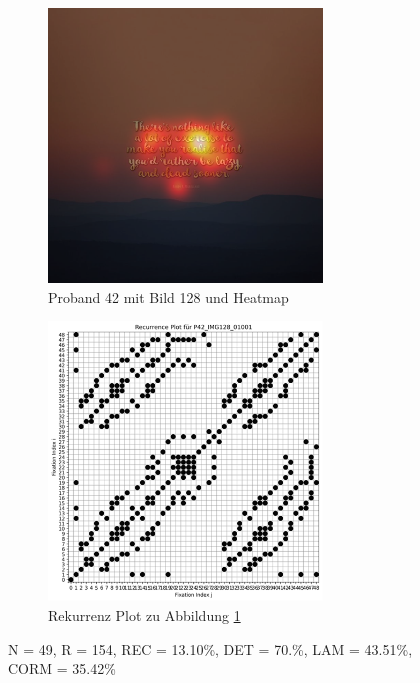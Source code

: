 \documentclass[
    language=german, %
    thesis=seminar, %
    supervisor=postdoc, %
    multiauthor=true, %
    ]{settings/csssa-thesis}
\begin{document}
\begin{figure}[ht]
    \centering
    \begin{subfigure}{0.49\textwidth}
        \centering
        \includegraphics[width=0.8\textwidth]{figures/Bild14.png}
        \caption{Proband 42 mit Bild 128 und Heatmap}\label{fig:Bild13a}
    \end{subfigure}
    \begin{subfigure}{0.49\textwidth}
        \centering
        \includegraphics[width=0.8\textwidth]{figures/Bild15.png}
        \caption{Rekurrenz Plot zu Abbildung \ref{fig:Bild13a}}\label{fig:Bild13b}
    \end{subfigure}\label{fig:Bild13}
    \caption{N = 49, R = 154, REC = 13.10\%, DET = 70.\%, LAM = 43.51\%, CORM = 35.42\%}
\end{figure}
\end{document}
